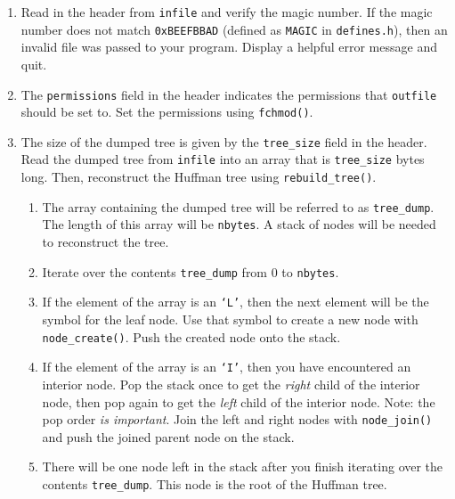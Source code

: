\begin{enumerate}
  \item Read in the header from \texttt{infile} and verify the magic
    number. If the magic number does not match \texttt{0xBEEFBBAD}
    (defined as \texttt{MAGIC} in \texttt{defines.h}), then an invalid
    file was passed to your program. Display a helpful error message and
    quit.

  \item The \texttt{permissions} field in the header indicates the
    permissions that \texttt{outfile} should be set to. Set the
    permissions using \texttt{fchmod()}.

  \item The size of the dumped tree is given by the \texttt{tree\_size}
    field in the header. Read the dumped tree from \texttt{infile} into
    an array that is \texttt{tree\_size} bytes long. Then, reconstruct
    the Huffman tree using \texttt{rebuild\_tree()}.\label{rebuild}

    \begin{enumerate}
      \item The array containing the dumped tree will be referred to as
        \texttt{tree\_dump}. The length of this array will be
        \texttt{nbytes}. A stack of nodes will be needed to reconstruct
        the tree.

      \item Iterate over the contents \texttt{tree\_dump} from $0$ to
        \texttt{nbytes}.

      \item If the element of the array is an \texttt{`L'}, then the
        next element will be the symbol for the leaf node. Use that
        symbol to create a new node with \texttt{node\_create()}. Push
        the created node onto the stack.

      \item If the element of the array is an \texttt{`I'}, then you
        have encountered an interior node. Pop the stack once to get the
        \emph{right} child of the interior node, then pop again to get
        the \emph{left} child of the interior node. Note: the pop order
        \emph{is important}. Join the left and right nodes with
        \texttt{node\_join()} and push the joined parent node on the
        stack.

      \item There will be one node left in the stack after you finish
        iterating over the contents \texttt{tree\_dump}. This node is
        the root of the Huffman tree.
    \end{enumerate}


\end{enumerate}
